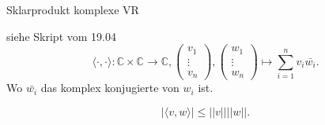 \documentclass[class=article, crop=false]{standalone}
\begin{document}
\begin{zettel}{Sklarprodukt komplexe VR}
\begin{flashcard}
\begin{definition}
    siehe Skript vom 19.04
    \[
        \langle \cdot,\cdot\rangle : \mathbb{C} \times \mathbb{C} \longrightarrow  \mathbb{C}, \begin{pmatrix}v_1 \\ \vdots \\ v_n\end{pmatrix}, \begin{pmatrix}w_1 \\ \vdots \\ w_n\end{pmatrix} \mapsto \sum_{i = 1}^{n} v_i \bar{w_i} 
    .\]
    Wo $ \bar{w_i} $ das komplex konjugierte von $w_i $ ist.
\end{definition}
\end{flashcard}
\begin{lemma}
    \[
        |\langle v,w\rangle| \leq  ||v|| ||w||
    .\]
    
\end{lemma}
\end{zettel}
\end{document}
